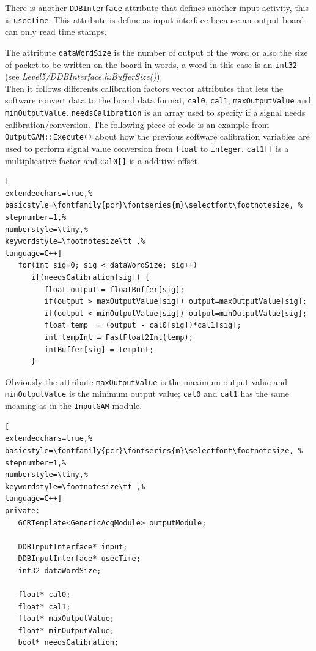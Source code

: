 There is another \texttt{DDBInterface} attribute that defines another input activity, this is \texttt{usecTime}. This attribute is define as input interface because an output board can only read time stamps.

The attribute \texttt{dataWordSize} is the number of output of the word or also the size of packet to be written on the board in words, a word in this case is an \texttt{int32} (see \textit{Level5/DDBInterface.h:BufferSize()}).\\


Then it follows differents calibration factors vector attributes that lets the software convert data to the board data format, \texttt{cal0}, \texttt{cal1}, \texttt{maxOutputValue} and \texttt{minOutputValue}. \texttt{needsCalibration} is an array used to specify if a signal needs calibration/conversion. The following piece of code is an example from \texttt{OutputGAM::Execute()} about how the previous software calibration variables are used to perform signal value conversion from \texttt{float} to \texttt{integer}. \texttt{cal1[]} is a multiplicative factor and \texttt{cal0[]} is a additive offset.

\begin{lstlisting}[
extendedchars=true,%
basicstyle=\fontfamily{pcr}\fontseries{m}\selectfont\footnotesize, %
stepnumber=1,%
numberstyle=\tiny,%
keywordstyle=\footnotesize\tt ,%
language=C++]
   for(int sig=0; sig < dataWordSize; sig++)
      if(needsCalibration[sig]) {
         float output = floatBuffer[sig];
         if(output > maxOutputValue[sig]) output=maxOutputValue[sig];
         if(output < minOutputValue[sig]) output=minOutputValue[sig];
         float temp  = (output - cal0[sig])*cal1[sig];
         int tempInt = FastFloat2Int(temp);
         intBuffer[sig] = tempInt;
      }
\end{lstlisting}

Obviously the attribute \texttt{maxOutputValue} is the maximum output value and \texttt{minOutputValue} is the minimum output value; \texttt{cal0} and \texttt{cal1} has the same meaning as in the \texttt{InputGAM} module.

\begin{lstlisting}[
extendedchars=true,%
basicstyle=\fontfamily{pcr}\fontseries{m}\selectfont\footnotesize, %
stepnumber=1,%
numberstyle=\tiny,%
keywordstyle=\footnotesize\tt ,%
language=C++]
private:
   GCRTemplate<GenericAcqModule> outputModule;

   DDBInputInterface* input;
   DDBInputInterface* usecTime;
   int32 dataWordSize;

   float* cal0;
   float* cal1;
   float* maxOutputValue;
   float* minOutputValue;
   bool* needsCalibration;
\end{lstlisting}

